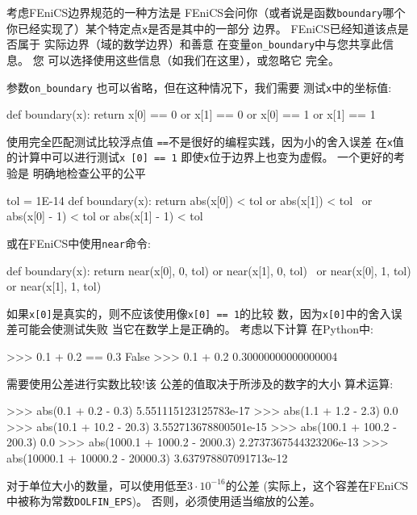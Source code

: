 考虑FEniCS边界规范的一种方法是
FEniCS会问你（或者说是函数\texttt{boundary}哪个
你已经实现了）某个特定点\texttt{x}是否是其中的一部分
边界。 FEniCS已经知道该点是否属于
实际边界（域的数学边界）和善意
在变量\verb!on_boundary!中与您共享此信息。 您
可以选择使用这些信息（如我们在这里），或忽略它
完全。

参数\verb!on_boundary! 也可以省略，但在这种情况下，我们需要
测试\texttt{x}中的坐标值:

\begin{python}
def boundary(x):
    return x[0] == 0 or x[1] == 0 or x[0] == 1 or x[1] == 1
\end{python}

使用完全匹配测试比较浮点值
\texttt{==}不是很好的编程实践，因为小的舍入误差
在\texttt{x}值的计算中可以进行测试\texttt{x [0] == 1}
即使\texttt{x}位于边界上也变为虚假。 一个更好的考验是
明确地检查公平的公平

\begin{python}
tol = 1E-14
def boundary(x):
    return abs(x[0]) < tol or abs(x[1]) < tol \
        or abs(x[0] - 1) < tol or abs(x[1] - 1) < tol
\end{python}
或在FEniCS中使用\texttt{near}命令:

\begin{python}
def boundary(x):
    return near(x[0], 0, tol) or near(x[1], 0, tol) \
        or near(x[0], 1, tol) or near(x[1], 1, tol)
\end{python}


\begin{notice}[不要使用\texttt{==}来比较实数!]
如果\texttt{x[0]}是真实的，则不应该使用像\texttt{x[0] == 1}的比较
数，因为\texttt{x[0]}中的舍入误差可能会使测试失败
当它在数学上是正确的。 考虑以下计算
在Python中:

\begin{python}
>>> 0.1 + 0.2 == 0.3
False
>>> 0.1 + 0.2
0.30000000000000004
\end{python}

需要使用公差进行实数比较!该
公差的值取决于所涉及的数字的大小
算术运算:

\begin{python}
>>> abs(0.1 + 0.2 - 0.3)
5.551115123125783e-17
>>> abs(1.1 + 1.2 - 2.3)
0.0
>>> abs(10.1 + 10.2 - 20.3)
3.552713678800501e-15
>>> abs(100.1 + 100.2 - 200.3)
0.0
>>> abs(1000.1 + 1000.2 - 2000.3)
2.2737367544323206e-13
>>> abs(10000.1 + 10000.2 - 20000.3)
3.637978807091713e-12
\end{python}
对于单位大小的数量，可以使用低至$3\cdot 10^{-16}$的公差
(实际上，这个容差在FEniCS中被称为常数\verb!DOLFIN_EPS!)。
否则，必须使用适当缩放的公差。
\end{notice}

